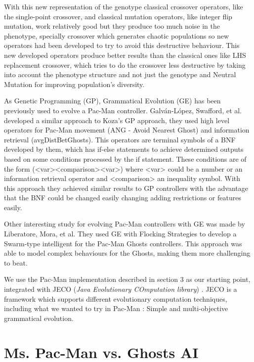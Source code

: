 \documentclass{llncs}
\newcommand{\pacman}{Ms. Pac-Man vs. Ghosts }
\newcommand{\paco}{Pac-Man }
\begin{document}
With this new representation of the genotype classical crossover operators, like the single-point crossover, and classical mutation operators, like integer flip mutation, work relatively good but they produce too much noise in the phenotype, specially crossover which generates chaotic populations so new operators had been developed to try to avoid this destructive behaviour. This new developed operators produce better results than the classical ones like LHS replacement crossover, which tries to do the crossover less destructive by taking into account the phenotype structure and not just the genotype \cite{harper_blair_2005}
and Neutral Mutation for improving population's diversity.\cite{oesch_maringer_2014}

As Genetic Programming (GP), Grammatical Evolution (GE) has been previously used to evolve a Pac-Man controller. Galván-López, Swafford, et al.\cite{galvan2010evolving}
developed a similar approach to Koza's GP approach, they used high level operators for Pac-Man movement (ANG - Avoid Nearest Ghost) and information retrieval (avgDistBetGhosts). This operators are terminal symbols of a BNF developed by them, which has if-else statements to achieve determined outputs based on some conditions processed by the if statement. These conditions are of the form (<var><comparison><var>) where <var> could be a number or an information retrieval operator and <comparison> an inequality symbol. With this approach they achieved similar results to GP controllers with the advantage that the BNF could be changed easily changing adding restrictions or features easily.

Other interesting study for evolving Pac-Man controllers with GE was made by Liberatore, Mora, et al.\cite{Liberatore2014}
They used GE with Flocking Strategies to develop a Swarm-type intelligent for the Pac-Man Ghosts controllers. This approach was able to model complex behaviours for the Ghosts, making them more challenging to beat.

We use the \paco implementation described in section 3 as our starting point, integrated with JECO (\textit{Java Evolutionary COmputation library}) \cite{jecorepo}. JECO is a framework which supports different evolutionary computation techniques, including what we wanted to try in \paco: Simple and multi-objective grammatical evolution.
%
\section{\pacman AI}
\label{sec:pacmanai}
%
\end{document}
